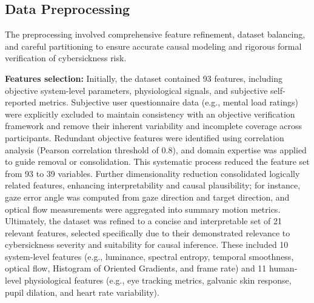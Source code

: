 \documentclass{vgtc}                          %
\newcommand{\kaiming}[1]{
        \textcolor{red}{{\em\bf Kaiming:} #1}}
\begin{document}



\subsection{Data Preprocessing}\label{sec:data_preprocessing}

The preprocessing involved comprehensive feature refinement, dataset balancing, and careful partitioning to ensure accurate causal modeling and rigorous formal verification of cybersickness risk.

\noindent\textbf{Features selection:} Initially, the dataset contained 93 features, including objective system-level parameters, physiological signals, and subjective self-reported metrics. Subjective user questionnaire data (e.g., mental load ratings) were explicitly excluded to maintain consistency with an objective verification framework and remove their inherent variability and incomplete coverage across participants. Redundant objective features were identified using correlation analysis (Pearson correlation threshold of 0.8), and domain expertise was applied to guide removal or consolidation. This systematic process reduced the feature set from 93 to 39 variables. Further dimensionality reduction consolidated logically related features, enhancing interpretability and causal plausibility; for instance, gaze error angle was computed from gaze direction and target direction, and optical flow measurements were aggregated into summary motion metrics. Ultimately, the dataset was refined to a concise and interpretable set of 21 relevant features, selected specifically due to their demonstrated relevance to cybersickness severity and suitability for causal inference. These included 10 system-level features (e.g., luminance, spectral entropy, temporal smoothness, optical flow, Histogram of Oriented Gradients, and frame rate) and 11 human-level physiological features (e.g., eye tracking metrics, galvanic skin response, pupil dilation, and heart rate variability).
\end{document}

